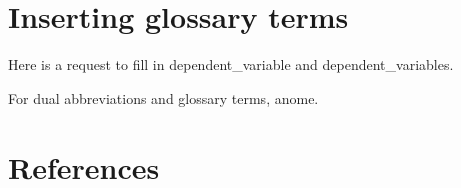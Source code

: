 \documentclass[10pt, letterpaper, twoside]{article}
\begin{document}
\section{Inserting glossary terms}\label{sec:glossary_terms}

Here is a request to fill in \gls{dependent_variable} and \glspl{dependent_variable}.

For dual abbreviations and glossary terms, \gls{anome}.



\newpage
\printunsrtglossary[type={abbreviations}]

\newpage
\printunsrtglossary[style={indexgroup}]

\newpage
\section{References}\label{sec:references}
\nocite{*}
\printbibliography[heading=none]
\end{document}
